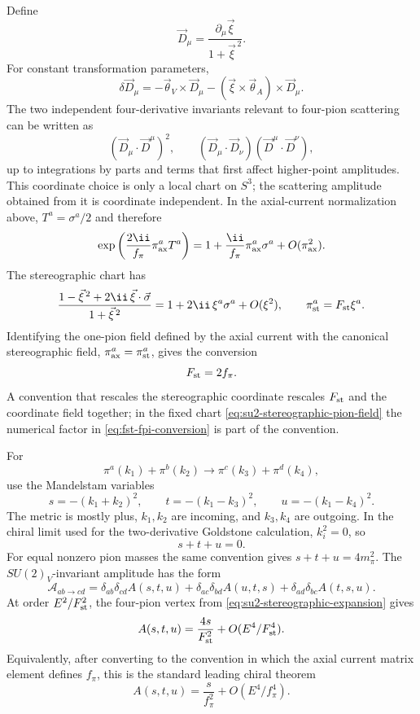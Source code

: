 Define
\begin{equation}
  \vec D_\mu
  =
  \frac{\partial_\mu\vec\xi}{1+\vec\xi^{\,2}} .
  \label{eq:su2-stereographic-d-field}
\end{equation}
For constant transformation parameters,
\begin{equation}
  \delta\vec D_\mu
  =
  -\vec\theta_V\times\vec D_\mu
  -(\vec\xi\times\vec\theta_A)\times\vec D_\mu .
  \label{eq:su2-stereographic-d-transformation}
\end{equation}
The two independent four-derivative invariants relevant to four-pion
scattering can be written as
\[
  (\vec D_\mu\cdot\vec D^\mu)^2,
  \qquad
  (\vec D_\mu\cdot\vec D_\nu)(\vec D^\mu\cdot\vec D^\nu),
\]
up to integrations by parts and terms that first affect higher-point
amplitudes.
This coordinate choice is only a local chart on \(S^3\); the scattering
amplitude obtained from it is coordinate independent.  In the axial-current
normalization above, \(T^a=\sigma^a/2\) and therefore
\[
  \exp\left(\frac{2\ii}{f_\pi}\pi_{\rm ax}^aT^a\right)
  =
  1+\frac{\ii}{f_\pi}\pi_{\rm ax}^a\sigma^a+O(\pi_{\rm ax}^2).
\]
The stereographic chart has
\[
  \frac{1-\vec\xi^{\,2}+2\ii\,\vec\xi\cdot\vec\sigma}
       {1+\vec\xi^{\,2}}
  =
  1+2\ii\,\xi^a\sigma^a+O(\xi^2),
  \qquad
  \pi_{\rm st}^a=F_{\rm st}\xi^a .
\]
Identifying the one-pion field defined by the axial current with the
canonical stereographic field,
\(\pi_{\rm ax}^a=\pi_{\rm st}^a\), gives the conversion
\begin{equation}
  F_{\rm st}=2f_\pi .
  \label{eq:fst-fpi-conversion}
\end{equation}
A convention that rescales the stereographic coordinate rescales
\(F_{\rm st}\) and the coordinate field together; in the fixed chart
\eqref{eq:su2-stereographic-pion-field} the numerical factor in
\eqref{eq:fst-fpi-conversion} is part of the convention.

For
\[
  \pi^a(k_1)+\pi^b(k_2)\to \pi^c(k_3)+\pi^d(k_4),
\]
use the Mandelstam variables
\[
  s=-(k_1+k_2)^2,\qquad
  t=-(k_1-k_3)^2,\qquad
  u=-(k_1-k_4)^2 .
\]
The metric is mostly plus, \(k_1,k_2\) are incoming, and \(k_3,k_4\) are
outgoing.  In the chiral limit used for the two-derivative Goldstone
calculation, \(k_i^2=0\), so
\[
  s+t+u=0 .
\]
For equal nonzero pion masses the same convention gives
\(s+t+u=4m_\pi^2\).
The \(SU(2)_V\)-invariant amplitude has the form
\begin{equation}
  \mathcal A_{ab\to cd}
  =
  \delta_{ab}\delta_{cd}A(s,t,u)
  +\delta_{ac}\delta_{bd}A(u,t,s)
  +\delta_{ad}\delta_{bc}A(t,s,u).
  \label{eq:pion-scattering-isospin-decomposition}
\end{equation}
At order \(E^2/F_{\rm st}^2\), the four-pion vertex from
\eqref{eq:su2-stereographic-expansion} gives
\begin{equation}
  A(s,t,u)
  =
  \frac{4s}{F_{\rm st}^2}
  +O(E^4/F_{\rm st}^4).
  \label{eq:pion-leading-scattering-amplitude}
\end{equation}
Equivalently, after converting to the convention in which the axial current
matrix element defines \(f_\pi\), this is the standard leading chiral theorem
\[
  A(s,t,u)=\frac{s}{f_\pi^2}+O(E^4/f_\pi^4).
\]

